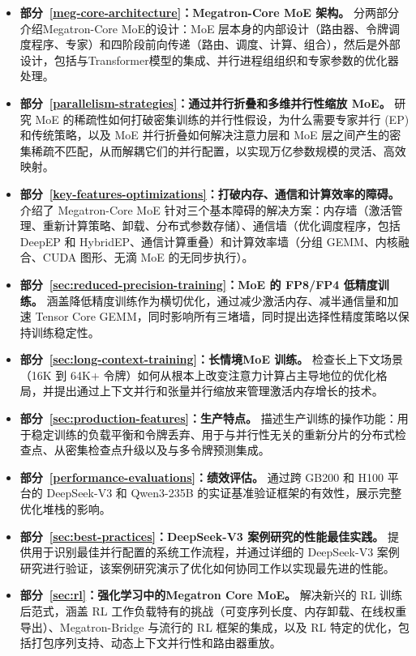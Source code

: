\documentclass[10pt,logo,copyright]{nvidiatechreport_zh}
\begin{document}
\begin{itemize}

\item \textbf{部分~\ref{meg-core-architecture}：Megatron-Core MoE 架构。}
分两部分介绍Megatron-Core MoE的设计：MoE 层本身的内部设计（路由器、令牌调度程序、专家）和四阶段前向传递（路由、调度、计算、组合），然后是外部设计，包括与Transformer模型的集成、并行进程组组织和专家参数的优化器处理。

\item \textbf{部分~\ref{parallelism-strategies}：通过并行折叠和多维并行性缩放 MoE。}
研究 MoE 的稀疏性如何打破密集训练的并行性假设，为什么需要专家并行 (EP) 和传统策略，以及 MoE 并行折叠如何解决注意力层和 MoE 层之间产生的密集稀疏不匹配，从而解耦它们的并行配置，以实现万亿参数规模的灵活、高效映射。

\item \textbf{部分~\ref{key-features-optimizations}：打破内存、通信和计算效率的障碍。}
介绍了 Megatron-Core MoE 针对三个基本障碍的解决方案：内存墙（激活管理、重新计算策略、卸载、分布式参数存储）、通信墙（优化调度程序，包括 DeepEP 和 HybridEP、通信计算重叠）和计算效率墙（分组 GEMM、内核融合、CUDA 图形、无滴 MoE 的无同步执行）。

\item \textbf{部分~\ref{sec:reduced-precision-training}：MoE 的 FP8/FP4 低精度训练。}
涵盖降低精度训练作为横切优化，通过减少激活内存、减半通信量和加速 Tensor Core GEMM，同时影响所有三堵墙，同时提出选择性精度策略以保持训练稳定性。

\item \textbf{部分~\ref{sec:long-context-training}：长情境MoE 训练。}
检查长上下文场景（16K 到 64K+ 令牌）如何从根本上改变注意力计算占主导地位的优化格局，并提出通过上下文并行和张量并行缩放来管理激活内存增长的技术。

\item \textbf{部分~\ref{sec:production-features}：生产特点。}
描述生产训练的操作功能：用于稳定训练的负载平衡和令牌丢弃、用于与并行性无关的重新分片的分布式检查点、从密集检查点升级以及与多令牌预测集成。

\item \textbf{部分~\ref{performance-evaluations}：绩效评估。}
通过跨 GB200 和 H100 平台的 DeepSeek-V3 和 Qwen3-235B 的实证基准验证框架的有效性，展示完整优化堆栈的影响。

\item \textbf{部分~\ref{sec:best-practices}：DeepSeek-V3 案例研究的性能最佳实践。}
提供用于识别最佳并行配置的系统工作流程，并通过详细的 DeepSeek-V3 案例研究进行验证，该案例研究演示了优化如何协同工作以实现最先进的性能。

\item \textbf{部分~\ref{sec:rl}：强化学习中的Megatron Core MoE。}
解决新兴的 RL 训练后范式，涵盖 RL 工作负载特有的挑战（可变序列长度、内存卸载、在线权重导出）、Megatron-Bridge 与流行的 RL 框架的集成，以及 RL 特定的优化，包括打包序列支持、动态上下文并行性和路由器重放。

\end{itemize}
\end{document}
